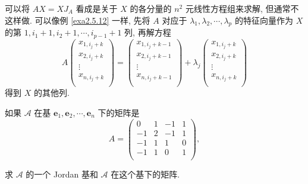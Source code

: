 \documentclass[color=black,device=normal,lang=cn,mode=geye]{elegantnote}
\begin{document}
可以将 $AX=XJ_A$ 看成是关于 $X$ 的各分量的 $n^2$ 元线性方程组来求解, 但通常不这样做. 可以像例 \ref{exa2.5.12} 一样, 先将 $A$ 对应于 $\lambda_1,\lambda_2,\cdots,\lambda_p$ 的特征向量作为 $X$ 的第 $1,i_1+1,i_2+1,\cdots,i_{p-1}+1$ 列, 再解方程
\[A\begin{pmatrix}
    x_{1,i_j+k} \\
    x_{2,i_j+k} \\
    \vdots \\
    x_{n,i_j+k} \\
\end{pmatrix}=\begin{pmatrix}
    x_{1,i_j+k-1} \\
    x_{2,i_j+k-1} \\
    \vdots \\
    x_{n,i_j+k-1} \\
\end{pmatrix}+\lambda_j\begin{pmatrix}
    x_{1,i_j+k} \\
    x_{2,i_j+k} \\
    \vdots \\
    x_{n,i_j+k} \\
\end{pmatrix}\]
得到 $X$ 的其他列.
\begin{example}[2.5.15(2)]\label{exa2.5.12}
    如果 $\mathcal{A}$ 在基 $\boldsymbol{e}_1,\boldsymbol{e}_2,\cdots,\boldsymbol{e}_n$ 下的矩阵是
    \[A=\begin{pmatrix}
        0 & 1 & -1 & 1 \\
        -1 & 2 & -1 & 1 \\
        -1 & 1 & 1 & 0 \\
        -1 & 1 & 0 & 1 \\
    \end{pmatrix},\]

    求 $\mathcal{A}$ 的一个 Jordan 基和 $\mathcal{A}$ 在这个基下的矩阵.
\end{example}
\end{document}
